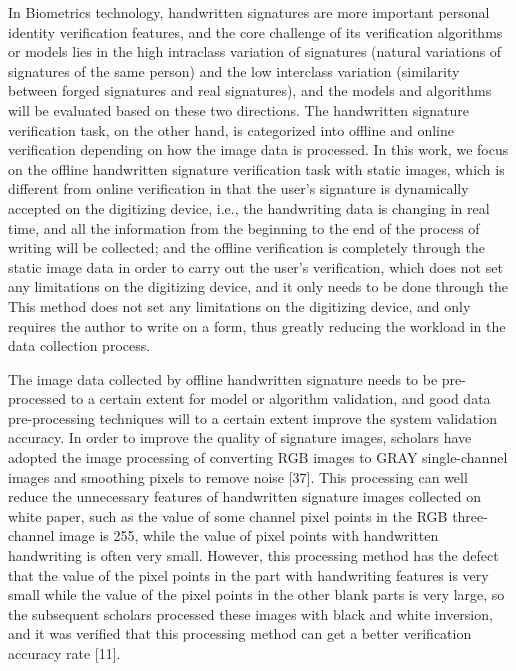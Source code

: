 In Biometrics technology, handwritten signatures are more important personal identity verification features, and the core challenge of its verification algorithms or models lies in the high intraclass variation of signatures (natural variations of signatures of the same person) and the low interclass variation (similarity between forged signatures and real signatures), and the models and algorithms will be evaluated based on these two directions. The handwritten signature verification task, on the other hand, is categorized into offline and online verification depending on how the image data is processed. In this work, we focus on the offline handwritten signature verification task with static images, which is different from online verification in that the user's signature is dynamically accepted on the digitizing device, i.e., the handwriting data is changing in real time, and all the information from the beginning to the end of the process of writing will be collected; and the offline verification is completely through the static image data in order to carry out the user's verification, which does not set any limitations on the digitizing device, and it only needs to be done through the This method does not set any limitations on the digitizing device, and only requires the author to write on a form, thus greatly reducing the workload in the data collection process.

The image data collected by offline handwritten signature needs to be pre-processed to a certain extent for model or algorithm validation, and good data pre-processing techniques will to a certain extent improve the system validation accuracy. In order to improve the quality of signature images, scholars have adopted the image processing of converting RGB images to GRAY single-channel images and smoothing pixels to remove noise [37]. This processing can well reduce the unnecessary features of handwritten signature images collected on white paper, such as the value of some channel pixel points in the RGB three-channel image is 255, while the value of pixel points with handwritten handwriting is often very small. However, this processing method has the defect that the value of the pixel points in the part with handwriting features is very small while the value of the pixel points in the other blank parts is very large, so the subsequent scholars processed these images with black and white inversion, and it was verified that this processing method can get a better verification accuracy rate [11].

